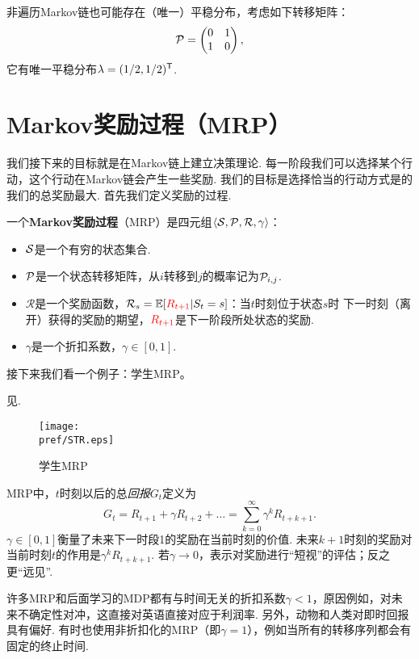 非遍历Markov链也可能存在（唯一）平稳分布，考虑如下转移矩阵：
\[\P=\begin{pmatrix}0&1\\1&0\end{pmatrix},\]
它有唯一平稳分布$\lambda=(1/2,1/2)^\t$.


\section{Markov奖励过程（MRP）}

我们接下来的目标就是在Markov链上建立决策理论. 每一阶段我们可以选择某个行动，这个行动在Markov链会产生一些奖励. 我们的目标是选择恰当的行动方式是的我们的总奖励最大. 首先我们定义奖励的过程.

\begin{definition}
一个\textbf{Markov奖励过程}（MRP）是四元组$\langle\MS,\P,\mathcal R,\gamma\rangle$：
\begin{itemize}
    \item $\MS$是一个有穷的状态集合.
    \item $\P$是一个状态转移矩阵，从$i$转移到$j$的概率记为$\P_{i,j}$.
    \item $\mathcal R$是一个奖励函数，$\mathcal R_s = \E[\textcolor{red}{R_{t+1}}|S_t=s]$：当$t$时刻位于状态$s$时 下一时刻（离开）获得的奖励的期望，$\textcolor{red}{R_{t+1}}$是下一阶段所处状态的奖励.
    \item $\gamma$是一个折扣系数，$\gamma\in[0,1]$.
\end{itemize}
\end{definition}


接下来我们看一个例子：学生MRP。
\begin{example}[学生MRP]
见.
\begin{figure}[ht]
    \centering
    \texttt{[image: \\pref/STR.eps]}
    \caption{学生MRP}
    \label{fig:student-MRP}
\end{figure}
\end{example}

 MRP中，$t$时刻以后的总\emph{回报}$G_t$定义为
    \[G_t = R_{t+1}+\gamma R_{t+2} +\dots =\sum_{k=0}^\infty \gamma^kR_{t+k+1}.\]
$\gamma \in[0,1]$衡量了未来下一时段1的奖励在当前时刻的价值. 未来$k+1$时刻的奖励对当前时刻$t$的作用是$\gamma^k R_{t+k+1}$. 若$\gamma\to0$，表示对奖励进行“短视”的评估；反之更“远见”.

许多MRP和后面学习的MDP都有与时间无关的折扣系数$\gamma <1$，原因例如，对未来不确定性对冲，这直接对英语直接对应于利润率. 另外，动物和人类对即时回报具有偏好. 有时也使用非折扣化的MRP（即$\gamma=1$），例如当所有的转移序列都会有固定的终止时间.

